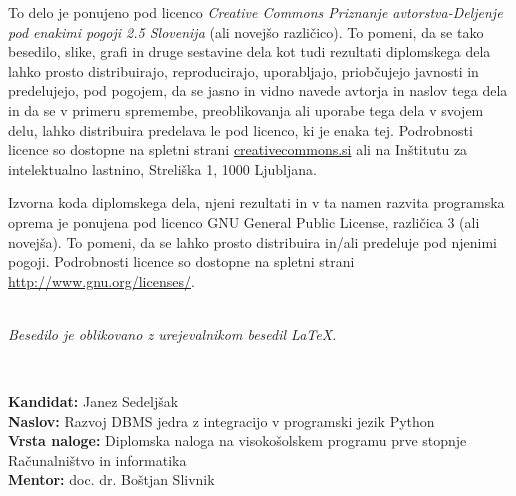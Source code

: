 \documentclass[a4paper,12pt,openright]{book}
\newcommand{\ttitle}{Razvoj DBMS jedra z integracijo v programski jezik Python}
\newcommand{\clearemptydoublepage}{\newpage{\pagestyle{empty}\cleardoublepage}}
\newcommand{\CcImageCc}[1]{%
	\texttt{[image: cc\_cc\_30.pdf]}%
}
\newcommand{\CcImageBy}[1]{%
	\texttt{[image: cc\_by\_30.pdf]}%
}
\newcommand{\CcImageSa}[1]{%
	\texttt{[image: cc\_sa\_30.pdf]}%
}
\begin{document}
\newpage
\thispagestyle{empty}

\vspace*{5cm}
{\small \noindent
To delo je ponujeno pod licenco \textit{Creative Commons Priznanje avtorstva-Deljenje pod enakimi pogoji 2.5 Slovenija} (ali novej\v so razli\v cico).
To pomeni, da se tako besedilo, slike, grafi in druge sestavine dela kot tudi rezultati diplomskega dela lahko prosto distribuirajo,
reproducirajo, uporabljajo, priobčujejo javnosti in predelujejo, pod pogojem, da se jasno in vidno navede avtorja in naslov tega
dela in da se v primeru spremembe, preoblikovanja ali uporabe tega dela v svojem delu, lahko distribuira predelava le pod
licenco, ki je enaka tej.
Podrobnosti licence so dostopne na spletni strani \href{http://creativecommons.si}{creativecommons.si} ali na Inštitutu za
intelektualno lastnino, Streliška 1, 1000 Ljubljana.

\vspace*{1cm}
\begin{center}%
\end{center}
}

\vspace*{1cm}
{\small \noindent
Izvorna koda diplomskega dela, njeni rezultati in v ta namen razvita programska oprema je ponujena pod licenco GNU General Public License,
različica 3 (ali novejša). To pomeni, da se lahko prosto distribuira in/ali predeluje pod njenimi pogoji.
Podrobnosti licence so dostopne na spletni strani \url{http://www.gnu.org/licenses/}.
}

\vfill
\begin{center} 
\ \\ \vfill
{\em
Besedilo je oblikovano z urejevalnikom besedil \LaTeX.}
\end{center}

\clearemptydoublepage

\thispagestyle{empty}
\
\vfill

\bigskip
\noindent\textbf{Kandidat:} Janez Sedeljšak\\
\noindent\textbf{Naslov:} \ttitle \\
\noindent\textbf{Vrsta naloge:} Diplomska naloga na visokošolskem programu prve stopnje Računalništvo in informatika \\
\noindent\textbf{Mentor:} doc. dr. Boštjan Slivnik\\
\end{document}
